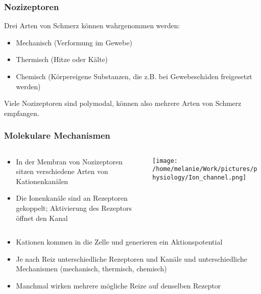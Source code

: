 \documentclass{beamer}
\begin{document}
\begin{frame}
\frametitle{Nozizeptoren}

Drei Arten von Schmerz können wahrgenommen werden:

\begin{itemize}
\item
Mechanisch (Verformung im Gewebe)
\item
Thermisch (Hitze oder Kälte)
\item
Chemisch (Körpereigene Substanzen, die z.B. bei Gewebeschäden freigesetzt werden)
\end{itemize}

\pause 
Viele Nozizeptoren sind \textcolor{theme}{polymodal}, können also mehrere Arten von Schmerz empfangen. 

\end{frame}



\begin{frame}
\frametitle{Molekulare Mechanismen}

\begin{columns}[c]

\begin{column}{7cm}
\begin{itemize}
\item
In der Membran von Nozizeptoren sitzen verschiedene Arten von Kationenkanälen 
\item
Die Ionenkanäle sind an Rezeptoren gekoppelt; Aktivierung des Rezeptors öffnet den Kanal
\end{itemize}



\end{column}

\begin{column}{5cm}
\begin{center}
\texttt{[image: /home/melanie/Work/pictures/physiology/Ion\_channel.png]}
\end{center}
\end{column}

\end{columns}

\begin{itemize}
\item
Kationen kommen in die Zelle und generieren ein Aktionspotential 
\item
Je nach Reiz unterschiedliche Rezeptoren und Kanäle und unterschiedliche Mechanismen (mechanisch, thermisch, chemisch)
\item
Manchmal wirken mehrere mögliche Reize auf denselben Rezeptor
\end{itemize}


\end{frame}
\end{document}
